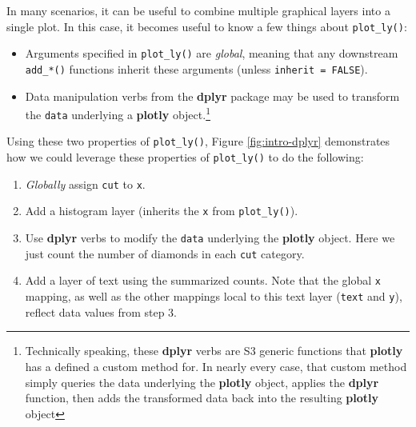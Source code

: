\documentclass[
  12pt,
]{krantz}
\newenvironment{Shaded}{\begin{snugshade}}{\end{snugshade}}
\newcommand{\DataTypeTok}[1]{\textcolor[rgb]{0.13,0.29,0.53}{#1}}
\newcommand{\KeywordTok}[1]{\textcolor[rgb]{0.13,0.29,0.53}{\textbf{#1}}}
\newcommand{\NormalTok}[1]{#1}
\newcommand{\OperatorTok}[1]{\textcolor[rgb]{0.81,0.36,0.00}{\textbf{#1}}}
\newcommand{\OtherTok}[1]{\textcolor[rgb]{0.56,0.35,0.01}{#1}}
\newcommand{\StringTok}[1]{\textcolor[rgb]{0.31,0.60,0.02}{#1}}
\providecommand{\tightlist}{%
  \setlength{\itemsep}{0pt}\setlength{\parskip}{0pt}}
\begin{document}
In many scenarios, it can be useful to combine multiple graphical layers into a single plot. In this case, it becomes useful to know a few things about \texttt{plot\_ly()}:

\begin{itemize}
\tightlist
\item
  Arguments specified in \texttt{plot\_ly()} are \emph{global}, meaning that any downstream \texttt{add\_*()} functions inherit these arguments (unless \texttt{inherit\ =\ FALSE}).
\item
  Data manipulation verbs from the \textbf{dplyr} package may be used to transform the \texttt{data} underlying a \textbf{plotly} object.\footnote{Technically speaking, these \textbf{dplyr} verbs are S3 generic functions that \textbf{plotly} has a defined a custom method for. In nearly every case, that custom method simply queries the data underlying the \textbf{plotly} object, applies the \textbf{dplyr} function, then adds the transformed data back into the resulting \textbf{plotly} object}
\end{itemize}

Using these two properties of \texttt{plot\_ly()}, Figure \ref{fig:intro-dplyr} demonstrates how we could leverage these properties of \texttt{plot\_ly()} to do the following:

\begin{enumerate}
\def\labelenumi{\arabic{enumi}.}
\tightlist
\item
  \emph{Globally} assign \texttt{cut} to \texttt{x}.
\item
  Add a histogram layer (inherits the \texttt{x} from \texttt{plot\_ly()}).
\item
  Use \textbf{dplyr} verbs to modify the \texttt{data} underlying the \textbf{plotly} object. Here we just count the number of diamonds in each \texttt{cut} category.
\item
  Add a layer of text using the summarized counts. Note that the global \texttt{x} mapping, as well as the other mappings local to this text layer (\texttt{text} and \texttt{y}), reflect data values from step 3.
\end{enumerate}

\begin{Shaded}
\end{Shaded}
\end{document}
